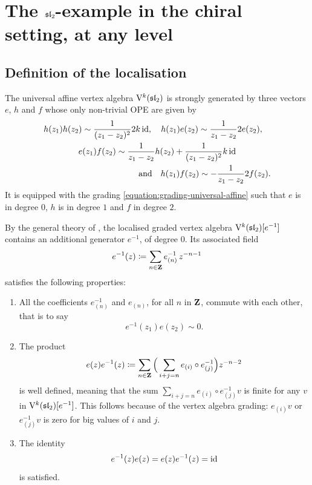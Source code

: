 \section{The $\sl_2$-example in the chiral setting, at any level} \label{section:sl2-example}

\subsection{Definition of the localisation}

The universal affine vertex algebra $\V^k(\sl_2)$ is strongly generated by three vectors $e$, $h$ and $f$ whose only non-trivial OPE are given by
\[ \begin{multlined}
	h(z_1) h(z_2) \sim \frac{1}{(z_1 - z_2)^2} 2 k \id, \quad h(z_1) e(z_2) \sim \frac{1}{z_1 - z_2} 2 e(z_2) , \\ e(z_1) f(z_2) \sim \frac{1}{z_1 - z_2} h(z_2) + \frac{1}{(z_1 - z_2)^2} k \id \\ \text{and} \quad h(z_1) f(z_2) \sim - \frac{1}{z_1 - z_2} 2 f(z_2).
\end{multlined} \]
It is equipped with the grading \eqref{equation:grading-universal-affine} such that $e$ is in degree $0$, $h$ is in degree $1$ and $f$ in degree $2$.

By the general theory of \cite{borisov2001vertex,arakawa2026faithful}, the localised graded vertex algebra $\V^k(\sl_2)[e^{-1}]$ contains an additional generator $e^{-1}$, of degree $0$. Its associated field
\[ e^{-1}(z) \coloneqq \sum_{n \in \Z} e^{-1}_{(n)} \, z^{- n -1} \]
satisfies the following properties:
\begin{enumerate}
	\item All the coefficients $e^{-1}_{(n)}$ and $e_{(n)}$, for all $n$ in $\Z$, commute with each other, that is to say
	\[ e^{-1}(z_1) e(z_2) \sim 0.  \]
	
	\item The product
	\[ e(z) e^{-1}(z) \coloneqq \sum_{n \in \Z} \Big(\sum_{i + j = n} e_{(i)} \circ e^{-1}_{(j)} \Big) z^{- n -2} \]
	is well defined, meaning that the sum $\sum_{i + j = n} e_{(i)} \circ e^{-1}_{(j)} v$ is finite for any $v$ in $\V^k(\sl_2)[e^{-1}]$. This follows because of the vertex algebra grading: $e_{(i)} v$ or $e^{-1}_{(j)} v$ is zero for big values of $i$ and $j$.
	
	\item The identity 
	\[ e^{-1}(z) e(z) = e(z) e^{-1}(z) = \id \]
	is satisfied.
\end{enumerate}

